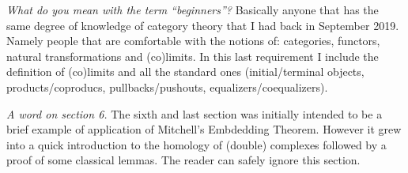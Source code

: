 \documentclass[12pt, letter paper, english, reqno]{article}
\theoremstyle{myteo}
\begin{document}
\medskip\noindent\emph{What do you mean with the term ``beginners''?}
Basically anyone that has the same degree of knowledge of category theory that I had back in September 2019.
Namely people that are comfortable with the notions of: categories, functors, natural transformations and (co)limits.
In this last requirement I include the definition of (co)limits and all the standard ones (initial/terminal objects, products/coproducs, pullbacks/pushouts, equalizers/coequalizers).

\medskip\noindent\emph{A word on section 6.}
The sixth and last section was initially intended to be a brief example of application of Mitchell's Embdedding Theorem.
However it grew into a quick introduction to the homology of (double) complexes followed by a proof of some classical lemmas.
The reader can safely ignore this section. 








\newpage

\end{document}
